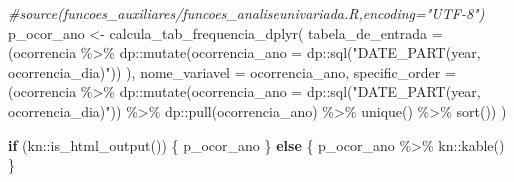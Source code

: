 \documentclass[
]{article}
\newenvironment{Shaded}{\begin{snugshade}}{\end{snugshade}}
\newcommand{\AttributeTok}[1]{\textcolor[rgb]{0.77,0.63,0.00}{#1}}
\newcommand{\CommentTok}[1]{\textcolor[rgb]{0.56,0.35,0.01}{\textit{#1}}}
\newcommand{\ControlFlowTok}[1]{\textcolor[rgb]{0.13,0.29,0.53}{\textbf{#1}}}
\newcommand{\FunctionTok}[1]{\textcolor[rgb]{0.00,0.00,0.00}{#1}}
\newcommand{\NormalTok}[1]{#1}
\newcommand{\OtherTok}[1]{\textcolor[rgb]{0.56,0.35,0.01}{#1}}
\newcommand{\SpecialCharTok}[1]{\textcolor[rgb]{0.00,0.00,0.00}{#1}}
\newcommand{\StringTok}[1]{\textcolor[rgb]{0.31,0.60,0.02}{#1}}
\begin{document}
\begin{Shaded}
\begin{Highlighting}[]
\CommentTok{\#source(\textquotesingle{}funcoes\_auxiliares/funcoes\_analiseunivariada.R\textquotesingle{},encoding="UTF{-}8")}
\NormalTok{p\_ocor\_ano }\OtherTok{\textless{}{-}} \FunctionTok{calcula\_tab\_frequencia\_dplyr}\NormalTok{(}
    \AttributeTok{tabela\_de\_entrada =}\NormalTok{ (ocorrencia }\SpecialCharTok{\%\textgreater{}\%}
\NormalTok{                            dp}\SpecialCharTok{::}\FunctionTok{mutate}\NormalTok{(}\StringTok{\textasciigrave{}}\AttributeTok{ocorrencia\_ano}\StringTok{\textasciigrave{}} \OtherTok{=}\NormalTok{ dp}\SpecialCharTok{::}\FunctionTok{sql}\NormalTok{(}\StringTok{"DATE\_PART(\textquotesingle{}year\textquotesingle{}, ocorrencia\_dia)"}\NormalTok{))}
\NormalTok{                         ), }
    \AttributeTok{nome\_variavel =} \StringTok{\textasciigrave{}}\AttributeTok{ocorrencia\_ano}\StringTok{\textasciigrave{}}\NormalTok{,}
    \AttributeTok{specific\_order =}\NormalTok{ (ocorrencia }\SpecialCharTok{\%\textgreater{}\%}
\NormalTok{                          dp}\SpecialCharTok{::}\FunctionTok{mutate}\NormalTok{(}\StringTok{\textasciigrave{}}\AttributeTok{ocorrencia\_ano}\StringTok{\textasciigrave{}} \OtherTok{=}\NormalTok{ dp}\SpecialCharTok{::}\FunctionTok{sql}\NormalTok{(}\StringTok{"DATE\_PART(\textquotesingle{}year\textquotesingle{}, ocorrencia\_dia)"}\NormalTok{)) }\SpecialCharTok{\%\textgreater{}\%}
\NormalTok{                          dp}\SpecialCharTok{::}\FunctionTok{pull}\NormalTok{(}\StringTok{\textasciigrave{}}\AttributeTok{ocorrencia\_ano}\StringTok{\textasciigrave{}}\NormalTok{) }\SpecialCharTok{\%\textgreater{}\%} 
                          \FunctionTok{unique}\NormalTok{() }\SpecialCharTok{\%\textgreater{}\%} \FunctionTok{sort}\NormalTok{())}
\NormalTok{)}

\ControlFlowTok{if}\NormalTok{ (kn}\SpecialCharTok{::}\FunctionTok{is\_html\_output}\NormalTok{()) \{}
\NormalTok{    p\_ocor\_ano}
\NormalTok{\} }\ControlFlowTok{else}\NormalTok{ \{}
\NormalTok{    p\_ocor\_ano }\SpecialCharTok{\%\textgreater{}\%}\NormalTok{ kn}\SpecialCharTok{::}\FunctionTok{kable}\NormalTok{()}
\NormalTok{\}}
\end{Highlighting}
\end{Shaded}
\end{document}
